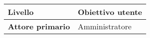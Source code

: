 \begin{longtable}{|l|l|}
	\textbf{Livello}                                                                                  & Obiettivo utente                                                                                                                                                                                                                                                                                                                                                                                                                                                                                                                                                                                                                                                                                                                                                                                                                                                                                                                                                                                                                                                                                                                                             \\ \hline
	\textbf{Attore primario}                                                                          & Amministratore                                                                                                                                                                                                                                                                                                                                                                                                                                                                                                                                                                                                                                                                                                                                                                                                                                                                                                                                                                                                                                                                                                                                               \\ \hline

\end{longtable}
